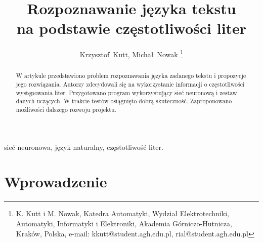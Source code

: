 \documentclass[journal]{IEEEtran}
\begin{document}
%
\title{Rozpoznawanie języka tekstu \\ na podstawie częstotliwości liter}

\author{Krzysztof~Kutt, Michał~Nowak
\thanks{K. Kutt i M. Nowak, Katedra Automatyki, Wydział Elektrotechniki, Automatyki, Informatyki i Elektroniki,
Akademia Górniczo-Hutnicza, Kraków, Polska, e-mail: kkutt@student.agh.edu.pl, rial@student.agh.edu.pl}}

%
{}

\maketitle


\begin{abstract}
W artykule przedstawiono problem rozpoznawania języka zadanego tekstu i propozycje jego rozwiązania.
Autorzy zdecydowali się na wykorzystanie informacji o częstotliwości występowania liter. Przygotowano
program wykorzystujący sieć neuronową i zestaw danych uczących. W trakcie testów osiągnięto dobrą skuteczność.
Zaproponowano możliwości dalszego rozwoju projektu.
\end{abstract}

\begin{IEEEkeywords}
sieć neuronowa, język naturalny, częstotliwość liter.
\end{IEEEkeywords}


\section{Wprowadzenie}
% 
% 
% 
% 
%
\end{document}
